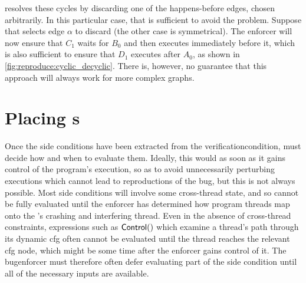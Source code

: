 {\Technique} resolves these cycles by discarding one of the
happens-before edges, chosen arbitrarily.  In this particular case,
that is sufficient to avoid the problem.  Suppose that {\technique}
selects edge $\alpha$ to discard (the other case is symmetrical).  The
enforcer will now ensure that $C_1$ waits for $B_0$ and then executes
immediately before it, which is also sufficient to ensure that $D_1$
executes after $A_0$, as shown in
\autoref{fig:reproduce:cyclic_decyclic}.  There is, however, no
guarantee that this approach will always work for more complex graphs.

\section{Placing s}
\label{sect:enforce:place_vcs}

Once the \glspl{side condition} have been extracted from the
\gls{verificationcondition}, {\technique} must decide how and when to
evaluate them.  Ideally, this would as soon as it gains control of the
program's execution, so as to avoid unnecessarily perturbing
executions which cannot lead to reproductions of the bug, but this is
not always possible.  Most \glspl{side condition} will involve some
cross-thread state, and so cannot be fully evaluated until the
enforcer has determined how program threads map onto the
{\StateMachine}'s crashing and interfering thread.  Even in the
absence of cross-thread constraints, expressions such as
${\mathsf{Control}}()$ which examine a thread's path through its
\gls{dynamic cfg} often cannot be evaluated until the thread reaches
the relevant \gls{cfg} node, which might be some time after the
enforcer gains control of it.  The \gls{bugenforcer} must therefore
often defer evaluating part of the \gls{side condition} until all of
the necessary inputs are available.

